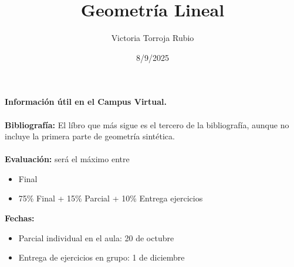 \documentclass{report}
\begin{document}
\title{Geometría Lineal}
\author{Victoria Torroja Rubio}
\date{8/9/2025}

\maketitle

\tableofcontents

\pagebreak

\textbf{Información útil en el Campus Virtual.} \\ \\
\textbf{Bibliografía:} El líbro que más sigue es el tercero de la bibliografía, aunque no incluye la primera parte de geometría sintética. \\ \\
\textbf{Evaluación:} será el máximo entre
\begin{itemize}
\item Final
\item 75\% Final + 15\% Parcial + 10\% Entrega ejercicios
\end{itemize}
\textbf{Fechas:} 
\begin{itemize}
\item Parcial individual en el aula: 20 de octubre
\item Entrega de ejercicios en grupo: 1 de diciembre
\end{itemize}



\end{document}
